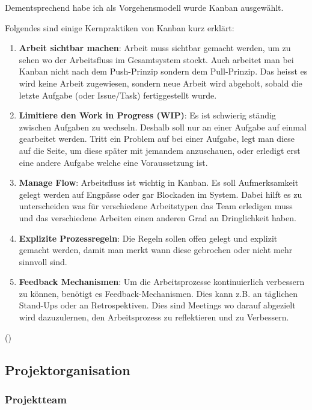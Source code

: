 Dementsprechend habe ich als Vorgehensmodell wurde Kanban ausgewählt.

Folgendes sind einige Kernpraktiken von Kanban kurz erklärt:

\begin{enumerate}
    \item \textbf{Arbeit sichtbar machen}: Arbeit muss sichtbar gemacht werden, um zu sehen wo der Arbeitsfluss im Gesamtsystem stockt.
        Auch arbeitet man bei Kanban nicht nach dem Push-Prinzip sondern dem Pull-Prinzip.
        Das heisst es wird keine Arbeit zugewiesen, sondern neue Arbeit wird abgeholt, sobald die letzte Aufgabe (oder Issue/Task) fertiggestellt wurde.
    \item \textbf{Limitiere den Work in Progress (WIP)}: Es ist schwierig ständig zwischen Aufgaben zu wechseln. Deshalb soll nur an einer Aufgabe auf einmal gearbeitet werden.
    Tritt ein Problem auf bei einer Aufgabe, legt man diese auf die Seite, um diese später mit jemandem anzuschauen, oder erledigt erst eine andere Aufgabe welche eine Voraussetzung ist.
    \item \textbf{Manage Flow}: Arbeitsfluss ist wichtig in Kanban.
    Es soll Aufmerksamkeit gelegt werden auf Engpässe oder gar Blockaden im System. Dabei hilft es zu unterscheiden was für verschiedene Arbeitstypen das Team erledigen muss und das verschiedene Arbeiten einen anderen Grad an Dringlichkeit haben.
    \item \textbf{Explizite Prozessregeln}: Die Regeln sollen offen gelegt und explizit gemacht werden, damit man merkt wann diese gebrochen oder nicht mehr sinnvoll sind.
    \item \textbf{Feedback Mechanismen}: Um die Arbeitsprozesse kontinuierlich verbessern zu können, benötigt es Feedback-Mechanismen. Dies kann z.B. an täglichen Stand-Ups oder an Retrospektiven. Dies sind Meetings wo darauf abgezielt wird dazuzulernen, den Arbeitsprozess zu reflektieren und  zu Verbessern.
\end{enumerate}

(\cite[p.~17-22]{siegfried_kaltenecker_kanban_2013})

\subsection{Projektorganisation}

\subsubsection{Projektteam}

